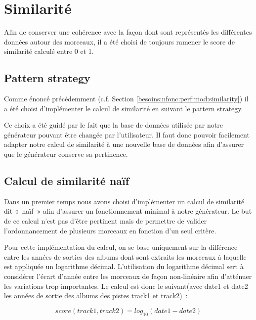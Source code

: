 \section{Similarité}
\label{impl:similarite}

Afin de conserver une cohérence avec la façon dont sont représentés les
différentes données autour des morceaux, il a été choisi de toujours ramener
le score de similarité calculé entre 0 et 1.

\subsection{Pattern strategy}
\label{impl:similatite:strategy}

Comme énoncé précédemment (c.f. Section
\ref{besoins:nfonc:perf:mod:similarity}) il a été choisi d'implémenter le calcul de similarité en suivant le pattern
strategy.\newline

Ce choix a été guidé par le fait que la base de données utilisée par notre
générateur pouvant être changée par l'utilisateur. Il faut donc pouvoir
facilement adapter notre calcul de similarité à une nouvelle base de données
afin d'assurer que le générateur conserve sa pertinence.

\subsection{Calcul de similarité naïf}
\label{impl:similarite:naif}

Dans un premier temps nous avons choisi d'implémenter un calcul de similarité
dit «~naïf~» afin d'assurer un fonctionnement minimal à notre générateur. 
Le but de ce calcul n'est pas d'être pertinent mais de permettre de valider
l'ordonnancement de plusieurs morceaux en fonction d'un seul critère.

Pour cette implémentation du calcul, on se base uniquement sur la différence
entre les années de sorties des albums dont sont extraits les morceaux à
laquelle est appliquée un logarithme décimal. L'utilisation du logarithme
décimal sert à considérer l'écart d'année entre les morceaux de façon
non-linéaire afin d'atténuer les variations trop importantes. Le calcul est
donc le suivant(avec date1 et date2 les années de sortie des albums des pistes
track1 et track2)~:

\begin{equation*}
  score(track1, track2) = log_{10}(date1 - date2)
\end{equation*}\newline

